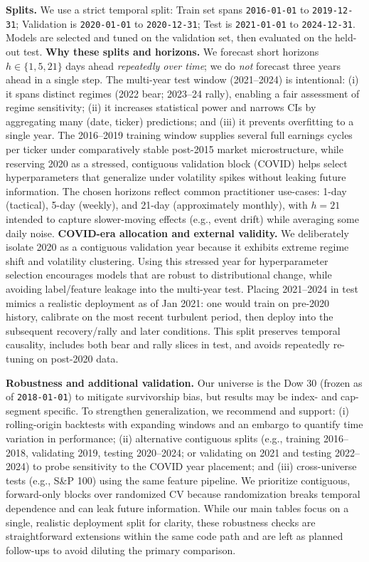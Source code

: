 \documentclass[10pt,twocolumn]{article}
\begin{document}
\textbf{Splits.} We use a strict temporal split: Train set spans \texttt{2016-01-01} to \texttt{2019-12-31}; Validation is \texttt{2020-01-01} to \texttt{2020-12-31}; Test is \texttt{2021-01-01} to \texttt{2024-12-31}. Models are selected and tuned on the validation set, then evaluated on the held-out test.
\textbf{Why these splits and horizons.} We forecast short horizons $h\in\{1,5,21\}$ days ahead \emph{repeatedly over time}; we do \emph{not} forecast three years ahead in a single step. The multi-year test window (2021--2024) is intentional: (i) it spans distinct regimes (2022 bear; 2023--24 rally), enabling a fair assessment of regime sensitivity; (ii) it increases statistical power and narrows CIs by aggregating many (date, ticker) predictions; and (iii) it prevents overfitting to a single year. The 2016--2019 training window supplies several full earnings cycles per ticker under comparatively stable post-2015 market microstructure, while reserving 2020 as a stressed, contiguous validation block (COVID) helps select hyperparameters that generalize under volatility spikes without leaking future information. The chosen horizons reflect common practitioner use-cases: 1-day (tactical), 5-day (weekly), and 21-day (approximately monthly), with $h{=}21$ intended to capture slower-moving effects (e.g., event drift) while averaging some daily noise.
\textbf{COVID-era allocation and external validity.} We deliberately isolate 2020 as a contiguous validation year because it exhibits extreme regime shift and volatility clustering. Using this stressed year for hyperparameter selection encourages models that are robust to distributional change, while avoiding label/feature leakage into the multi-year test. Placing 2021--2024 in test mimics a realistic deployment as of Jan 2021: one would train on pre-2020 history, calibrate on the most recent turbulent period, then deploy into the subsequent recovery/rally and later conditions. This split preserves temporal causality, includes both bear and rally slices in test, and avoids repeatedly re-tuning on post-2020 data.

\textbf{Robustness and additional validation.} Our universe is the Dow 30 (frozen as of \texttt{2018-01-01}) to mitigate survivorship bias, but results may be index- and cap-segment specific. To strengthen generalization, we recommend and support: (i) rolling-origin backtests with expanding windows and an embargo to quantify time variation in performance; (ii) alternative contiguous splits (e.g., training 2016--2018, validating 2019, testing 2020--2024; or validating on 2021 and testing 2022--2024) to probe sensitivity to the COVID year placement; and (iii) cross-universe tests (e.g., S\&P 100) using the same feature pipeline. We prioritize contiguous, forward-only blocks over randomized CV because randomization breaks temporal dependence and can leak future information. While our main tables focus on a single, realistic deployment split for clarity, these robustness checks are straightforward extensions within the same code path and are left as planned follow-ups to avoid diluting the primary comparison.
\end{document}
